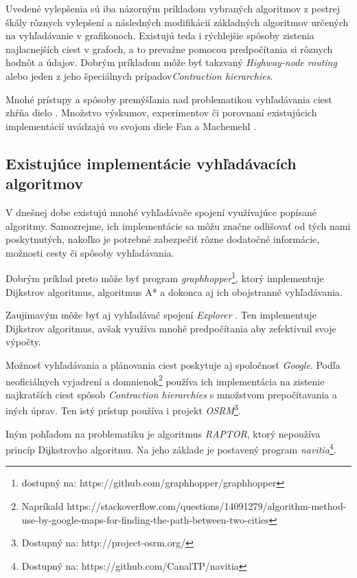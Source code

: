 Uvedené vylepšenia sú iba názorným príkladom vybraných algoritmov z pestrej škály rôznych vylepšení a následných modifikácií základných algoritmov určených na vyhľadávanie v grafikonoch. Existujú teda i rýchlejšie spôsoby zistenia najlacnejších ciest v grafoch, a to prevažne pomocou predpočítania si rôznych hodnôt a údajov. Dobrým príkladom môže byť takzvaný \textit{Highway-node routing}\cite{schultes2007dynamic} alebo jeden z jeho špeciálnych prípadov\textendash \textit{Contraction hierarchies}\cite{geisberger2008contraction}.\newline

Mnohé prístupy a spôsoby premýšľania nad problematikou vyhľadávania ciest zhŕňa dielo \cite{bast2010fast}. Množstvo výskumov, experimentov či porovnaní existujúcich implementácií uvádzajú vo svojom diele Fan a Machemehl \cite{fan2004optimal}.


\subsection{Existujúce implementácie vyhľadávacích algoritmov}

V dnešnej dobe existujú mnohé vyhľadávače spojení využívajúce popísané algoritmy. Samozrejme, ich implementácie sa môžu značne odlišovať od tých nami poskytnutých, nakoľko je potrebné zabezpečiť rôzne dodatočné informácie, možnosti cesty či spôsoby vyhľadávania.\newline

Dobrým príklad preto môže byť program \textit{graphhopper}\footnote{dostupný na: https://github.com/graphhopper/graphhopper}, ktorý implementuje Dijkstrov algoritmus, algoritmus A* a dokonca aj ich obojstranné vyhľadávania.\newline

Zaujímavým môže byť aj vyhľadávač spojení \textit{Explorer} \cite{watkins2010explore}. Ten implementuje Dijkstrov algoritmus, avšak využíva mnohé predpočítania aby zefektívnil svoje výpočty.\newline

Možnosť vyhľadávania a plánovania ciest poskytuje aj spoločnosť \textit{Google}. Podľa neoficiálnych vyjadrení a domnienok\footnote{Napríkald https://stackoverflow.com/questions/14091279/algorithm-method-use-by-google-maps-for-finding-the-path-between-two-cities} používa ich implementácia na zistenie najkratších ciest spôsob \textit{Contraction hierarchies} s množstvom prepočítavania a iných úprav. Ten istý prístup používa i projekt \textit{OSRM}\footnote{Dostupný na: http://project-osrm.org/}.\newline

Iným pohľadom na problematiku je algoritmus \textit{RAPTOR}\cite{delling2014round}, ktorý nepoužíva princíp Dijkstrovho algoritmu. Na jeho základe je postavený program \textit{navitia}\footnote{Dostupný na: https://github.com/CanalTP/navitia}.\newline
